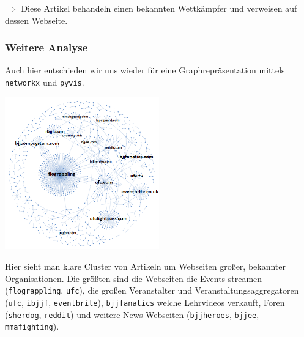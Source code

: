 \noindent$\Rightarrow$ Diese Artikel behandeln einen bekannten Wettkämpfer und verweisen auf dessen Webseite.

\newpage
\subsubsection*{Weitere Analyse}

Auch hier entschieden wir uns wieder für eine Graphrepräsentation mittels \texttt{networkx} und \texttt{pyvis}.

\begin{center}
	\includegraphics[width=0.5\textwidth]{images/GrapplingInsiderGraph.png}
\end{center}

\noindent Hier sieht man klare Cluster von Artikeln um Webseiten gro{\ss}er, bekannter Organisationen. Die grö{\ss}ten sind die Webseiten die Events streamen (\texttt{flograppling}, \texttt{ufc}), die gro{\ss}en Veranstalter und Veranstaltungsaggregatoren (\texttt{ufc}, \texttt{ibjjf}, \texttt{eventbrite}), \texttt{bjjfanatics} welche Lehrvideos verkauft, Foren (\texttt{sherdog}, \texttt{reddit}) und weitere News Webseiten (\texttt{bjjheroes}, \texttt{bjjee}, \texttt{mmafighting}).